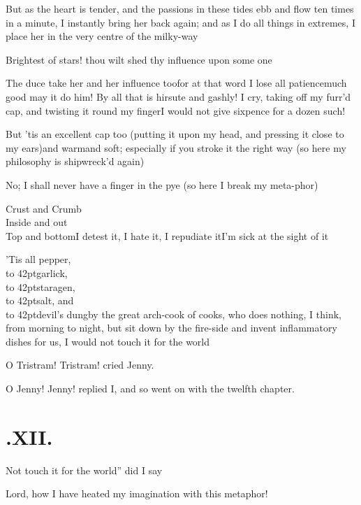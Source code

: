 \documentclass{article}
\begin{document}
But as the heart is tender, and the passions in these tides ebb
and flow ten times in a minute, I instantly bring her back again;
and as I do all things in extremes, I place her in the very
centre\break
of the milky-way\tsh

Brightest of stars! thou wilt shed thy influence upon some
one\tsh

\newpage
\tsh The duce take her and her influence
too\tsh for at that word I lose all
patience\tsh much good may it do him! \tsh By all
that is hirsute and gashly!\break
I cry, taking off my furr’d cap, and twisting it round my
finger\tsh I would not give sixpence for a dozen such!

\tsh But ’tis an excellent cap too (putting it upon my head, and
pressing it close to my ears)\tsk and warm\tsk and soft;
especially if you stroke it the right way\tsk\break
{}
(so here my philosophy is shipwreck’d again)

\tsh No; I shall never have a finger in the pye (so
here I break my meta-\break phor)\tsh

\newpage
Crust and Crumb\\
\null\indent Inside and out\\
\null\indent Top and bottom\tsh I detest it, I hate it, I repudiate
it\tsh I’m sick at the sight of it \tsh 

’Tis all pepper,\\
\null\hbox to 42pt{\hss}garlick,\\
\null\hbox to 42pt{\hss}staragen,\\
\null\hbox to 42pt{\hss}salt, and\\
\null\hbox to 42pt{\hss}devil’s dung\tsh by
the great arch-cook of cooks, who does nothing, I think, from
morning to night, but sit down by the fire-side and invent
inflammatory dishes for us, I would not touch it for the
world\tsh

\tsh O Tristram! Tristram! cried Jenny.

\newpage
O Jenny! Jenny! replied I, and so went on
with the twelfth chapter.

\section{.\enspace XII.}

\qquad\tsh \lqq Not touch it for the world”\break
did I say\tsh

Lord, how I have heated my imagination with this metaphor!
\end{document}
